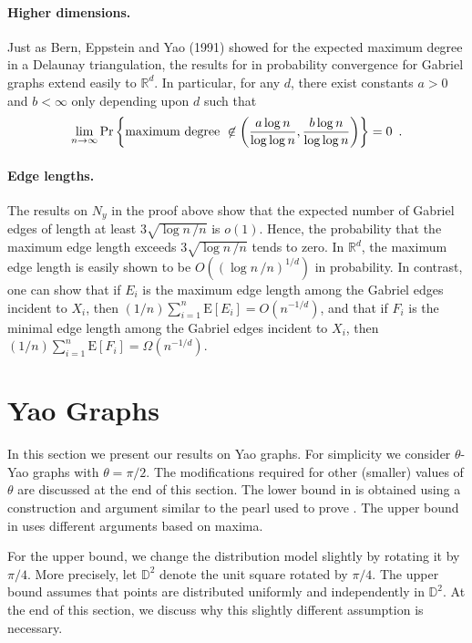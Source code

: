 \documentclass[lotsofwhite,charterfonts]{patmorin}
\newcommand{\RR}{\mathbb{R}}
\newcommand{\D}{\mathbb{D}}
\newcommand{\PROB}{\Pr}
\newcommand{\EXP}{\mathrm{E}}
\begin{document}
\paragraph{Higher dimensions.}
Just as Bern, Eppstein and Yao (1991) showed for the
expected maximum degree in a Delaunay triangulation, 
the results for in probability convergence for Gabriel graphs
extend easily to $\RR^d$. In particular,
for any $d$, there exist constants $a>0$ and $b < \infty$ 
only depending upon $d$ such that
\[
\lim_{n\to\infty} \PROB \left\{ \hbox{\rm maximum degree}~\not\in 
  \left( {a \log n \over \log \log n} , { b \log n \over \log \log n} \right)
  \right\} = 0 \enspace .
\]

\paragraph{Edge lengths.}
The results on $N_y$ in the proof above
show that the expected number of Gabriel
edges of length at least $3 \sqrt{\log n \,/n}$
is $o(1)$. Hence, the probability that the maximum edge
length exceeds $3 \sqrt{\log n \,/n}$ tends to zero.
In $\RR^d$, the maximum edge length is
easily shown to be $O((\log n \,/n)^{1/d})$ in
probability.
In contrast, one can show that if $E_i$ is the
maximum edge length among the Gabriel edges incident to $X_i$,
then $(1/n) \sum_{i=1}^n \EXP[E_i]= O(n^{-1/d})$,
and that if 
$F_i$ is the
minimal edge length among the Gabriel edges incident to $X_i$,
then $(1/n) \sum_{i=1}^n \EXP[F_i]= \Omega (n^{-1/d})$. 

\section{Yao Graphs}

In this section we present our results on Yao graphs.  For simplicity
we consider $\theta$-Yao graphs with $\theta=\pi/2$.  The modifications
required for other (smaller) values of $\theta$ are discussed at the end
of this section.  The lower bound in  is obtained
using a construction and argument similar to the pearl used to prove
.  The upper bound in 
uses different arguments based on maxima.

For the upper bound, we change the distribution model slightly by rotating
it by $\pi/4$.  More precisely, let $\D^2$ denote the unit square rotated
by $\pi/4$.  The upper bound assumes that points are distributed uniformly
and independently in $\D^2$. At the end of this section, we discuss why
this slightly different assumption is necessary.
\end{document}
